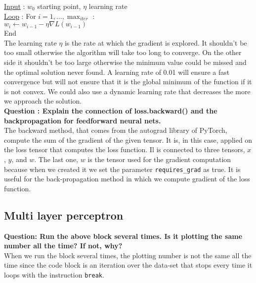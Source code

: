 \underline{Input} : $w_0$ starting point, $\eta$ learning rate  \\ \underline{Loop} :  For $i=1,\dots, \max_{iter}$ :  \\ \hspace*{16mm} 
$w_i \leftarrow w_{i-1} - \eta \nabla L(w_{i-1})$ \\ \hspace*{10mm} End \\

The learning rate $\eta$ is the rate at which the gradient is explored. It shouldn't be too small otherwise the algorithm will take too long to converge. On the other side it shouldn't be too large otherwise the minimum value could be  missed and the optimal solution never found. A learning rate of 0.01 will ensure a fast convergence but will not ensure that it is the global minimum of the function if it is not convex. We could also use a dynamic learning rate that decreases the more we approach the solution. \\

\textbf{Question : Explain the connection of loss.backward() and the backpropagation for feedforward neural nets. } \\
The backward method, that comes from the autograd library of PyTorch, compute the sum of the gradient of the given tensor. It is, in this case, applied on the loss tensor that computes the loss function. Il is connected to three tensors, $x$, $y$, and $w$. The last one, $w$ is the tensor used for the gradient computation because when we created it we set the parameter \verb|requires_grad| as true. It is useful for the back-propagation method in which we compute gradient of the loss function. 



\subsection{Multi layer perceptron}
\textbf{{Question}: Run the above block several times. Is it plotting the same number all the time? If not, why?} \\

When we run the block several times, the plotting number is not the same all the time since the code block is an iteration over the data-set that stops every time it loops with the instruction \verb|break|. 










